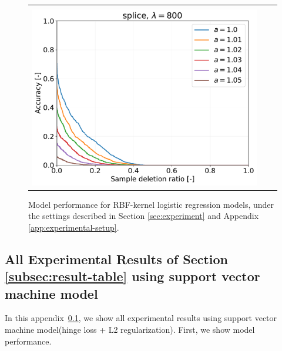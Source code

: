 \begin{figure}[H]
\begin{tabular}{ccc}
		\begin{minipage}[b]{0.3\hsize}\centering {\small Dataset: splice, $\lambda=n$}\\\includegraphics[width=0.8\hsize]{fig/table_logistic/splice_scale-logistic/kernel/kernel_ss_screening_rate_lam800_x_n_y_etest.pdf}\end{minipage}
		\\
	
	\end{tabular}
	\caption{Model performance for RBF-kernel logistic regression models, under the settings described in Section \ref{sec:experiment} and Appendix \ref{app:experimental-setup}.}
	\label{fig:result-guarantee-logistic}
	\end{figure}

	\newpage
\subsection{All Experimental Results of Section \ref{subsec:result-table} using support vector machine model} \label{app:result-svm}

In this appendix~\ref{app:result-svm}, we show all experimental results using support vector machine model(hinge loss + L2 regularization). First, we show model performance.

